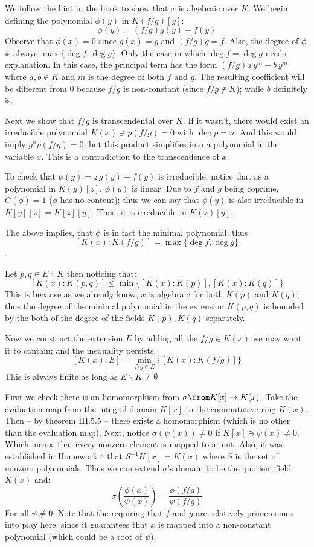 We follow the hint in the book to show that $x$ is algebraic over $K$. 
We begin defining the polynomial $\phi(y)$ in $K(f/g)[y]$:
$$\phi(y) = (f/g)g(y) - f(y)$$
Observe that $\phi(x) =0$ since $g(x)=g$ and $(f/g)g=f$. 
Also, the degree of $\phi$ is always $\max\{ \deg f, \deg g\}$. 
Only the case in which $\deg f= \deg g$ needs explanation. 
In this case, the principal term has the form $(f/g) a\, y^m - b\, y^m$ where $a,b\in K$ and $m$ is the degree of both $f$ and $g$.
The resulting coefficient will be different from 0 because $f/g$ is non-constant (since $f/g\notin K$); while $b$ definitely is.

Next we show that $f/g$ is transcendental over $K$.
If it wasn't, there would exist an irreducible polynomial $K(x) \ni p(f/g)=0$ with $\deg p = n$.
And this would imply $g^np(f/g)=0$, but this product simplifies into a polynomial in the variable $x$.
This is a contradiction to the transcendence of $x$.

To check that $\phi(y)=z\,g(y)-f(y)$ is irreducible, notice that as a polynomial in $K(y)[z]$, $\phi(y)$ is linear. 
Due to $f$ and $g$ being coprime, $C(\phi)=1$ ($\phi$ has no content); thus we can say that  $\phi(y)$ is also irreducible in $K[y][z]=K[z][y]$.
Thus, it is irreducible in $K(z)[y]$.

The above implies, that $\phi$ is in fact the minimal polynomial; thus $$[K(x):K(f/g)]= \max\{ \deg f, \deg g\}$$.

Let $p,q\in E\backslash K$ then noticing that:
$$[K(x):K(p,q)] \leq \min\{ [K(x):K(p)], [K(x):K(q)]\}$$
This is because as we already know,  $x$ is algebraic for both $K(p)$ and $K(q)$; 
thus the degree of the minimal polynomial in the extension $K(p,q)$ is bounded by the both of the degree of the fields $K(p),K(q)$ separately.  

Now we construct the extension $E$ by adding all the $f/g\in K(x)$ we may want it to contain; and the inequality persists:
$$[K(x):E] = \min_{f/g\in E} \{[K(x):K(f/g)]\}$$
This is always finite as long as $E\backslash K\neq \emptyset$

First we check there is an homomorphism from $\sigma \from K[x]\to K(x)$.
Take the evaluation map from the integral domain $K[x]$ to the commutative ring $K(x)$.
Then -- by theorem III.5.5 -- there exists a homomorphism (which is no other than the evaluation map).
Next, notice $\sigma(\psi(x))\neq 0$ if $K[x]\ni \psi(x) \neq 0$. Which means that every nonzero element is mapped to a unit.
Also, it was established in Homework 4 that $S^{-1}K[x] = K(x)$ where $S$ is the set of nonzero polynomials.
Thus we can extend $\sigma$'s domain to be the quotient field $K(x)$ and:
\begin{equation} \label{ecua.1}
\sigma\left(\frac{\phi(x)}{\psi(x)}\right) = \frac{\phi(f/g)}{\psi(f/g)}
\end{equation}
For all $\psi\neq 0$. 
Note that the requiring that $f$ and $g$ are relatively prime comes into play here, since it guarantees that $x$ is mapped into a non-constant polynomial (which could be a root of $\psi$).


